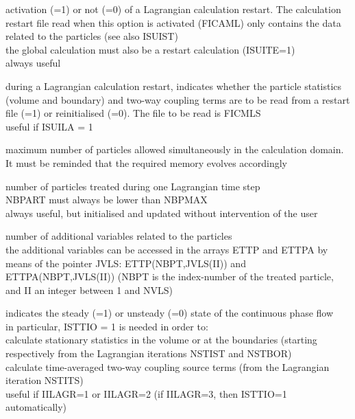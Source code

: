 {activation (=1) or not (=0) of a Lagrangian calculation restart. 
The calculation restart file read when this option is activated (FICAML)
only contains the data related to the particles (see also ISUIST)\\
the global calculation must also be a restart calculation (ISUITE=1)\\
always useful}

{during a Lagrangian calculation restart, indicates whether the particle
statistics (volume and boundary) and two-way coupling terms are to be read from
a restart file (=1) or reinitialised (=0). The file to be read is FICMLS\\ 
useful if ISUILA = 1}

{maximum number of particles allowed simultaneously in the calculation
domain. It must be reminded that the required memory evolves accordingly}

{number of particles treated during one Lagrangian time step\\
NBPART must always be lower than NBPMAX\\
always useful, but initialised and updated without intervention of the user}

{number of additional variables related to the particles\\
the additional variables can be accessed in the arrays
ETTP and ETTPA by means of the pointer
JVLS: ETTP(NBPT,JVLS(II)) and ETTPA(NBPT,JVLS(II)) (NBPT is
the index-number of the treated particle, and II an integer between 1 and NVLS)}

{indicates the steady (=1) or unsteady (=0) state of the
continuous phase flow\\
in particular, ISTTIO = 1 is needed in order to: \\
\hspace*{1cm}calculate stationary statistics in the volume or at the boundaries
(starting respectively from the Lagrangian iterations NSTIST and NSTBOR) \\
\hspace*{1cm}calculate time-averaged two-way coupling source terms (from the
Lagrangian iteration NSTITS) \\
useful if IILAGR=1 or IILAGR=2 (if IILAGR=3, then ISTTIO=1 automatically)} 

